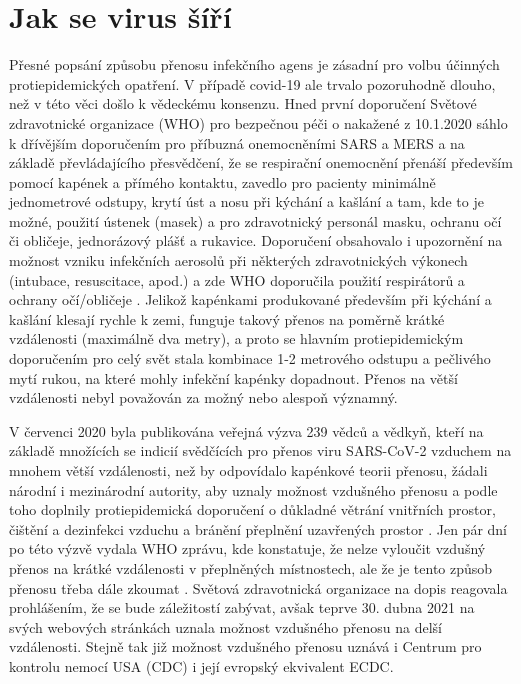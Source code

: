 \section*{Jak se virus šíří}
Přesné popsání způsobu přenosu infekčního agens je zásadní pro volbu účinných protiepidemických opatření. V případě covid-19 ale trvalo pozoruhodně dlouho, než v této věci došlo k vědeckému konsenzu. Hned první doporučení Světové zdravotnické organizace (WHO) pro bezpečnou péči o nakažené z 10.1.2020 sáhlo k dřívějším doporučením pro příbuzná onemocněními SARS a MERS \cite{WHO:2014} a na základě převládajícího přesvědčení, že se respirační onemocnění přenáší především pomocí kapének a přímého kontaktu, zavedlo pro pacienty minimálně jednometrové odstupy, krytí úst a nosu při kýchání a kašlání a tam, kde to je možné, použití ústenek (masek) a pro zdravotnický personál masku, ochranu očí či obličeje, jednorázový plášť a rukavice. Doporučení obsahovalo i upozornění na možnost vzniku infekčních aerosolů při některých zdravotnických výkonech (intubace, resuscitace, apod.) a zde WHO doporučila použití respirátorů a ochrany očí/obličeje \cite{WHO:2020b}. Jelikož kapénkami produkované především při kýchání a kašlání klesají rychle k zemi, funguje takový přenos na poměrně krátké vzdálenosti (maximálně dva metry), a proto se hlavním protiepidemickým doporučením pro celý svět stala kombinace 1-2 metrového odstupu a pečlivého mytí rukou, na které mohly infekční kapénky dopadnout. Přenos na větší vzdálenosti nebyl považován za možný nebo alespoň významný.

V červenci 2020 byla publikována veřejná výzva 239 vědců a vědkyň, kteří na základě množících se indicií svědčících pro přenos viru SARS-CoV-2 vzduchem na mnohem větší vzdálenosti, než by odpovídalo kapénkové teorii přenosu, žádali národní i mezinárodní autority, aby uznaly možnost vzdušného přenosu a podle toho doplnily protiepidemická doporučení o důkladné větrání vnitřních prostor, čištění a dezinfekci vzduchu a bránění přeplnění uzavřených prostor \cite{Morawska:2020}. Jen pár dní po této výzvě vydala WHO zprávu, kde konstatuje, že nelze vyloučit vzdušný přenos na krátké vzdálenosti v přeplněných místnostech, ale že je tento způsob přenosu třeba dále zkoumat \cite{WHO:2020c}. Světová zdravotnická organizace na dopis reagovala prohlášením, že se bude záležitostí zabývat, avšak teprve 30. dubna 2021 na svých webových stránkách uznala možnost vzdušného přenosu na delší vzdálenosti. Stejně tak již možnost vzdušného přenosu uznává i Centrum pro kontrolu nemocí USA (CDC) i její evropský ekvivalent ECDC.

